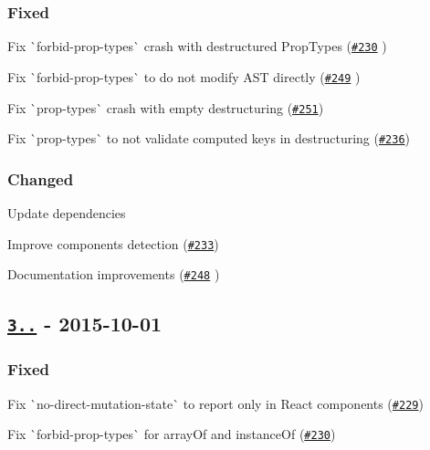 \subsubsection*{Fixed}


\begin{DoxyItemize}
\item Fix \`{}forbid-\/prop-\/types\`{} crash with destructured Prop\+Types (\href{https://github.com/yannickcr/eslint-plugin-react/issues/230}{\tt \#230} )
\item Fix \`{}forbid-\/prop-\/types\`{} to do not modify A\+ST directly (\href{https://github.com/yannickcr/eslint-plugin-react/issues/249}{\tt \#249} )
\item Fix \`{}prop-\/types\`{} crash with empty destructuring (\href{https://github.com/yannickcr/eslint-plugin-react/issues/251}{\tt \#251})
\item Fix \`{}prop-\/types\`{} to not validate computed keys in destructuring (\href{https://github.com/yannickcr/eslint-plugin-react/issues/236}{\tt \#236})
\end{DoxyItemize}

\subsubsection*{Changed}


\begin{DoxyItemize}
\item Update dependencies
\item Improve components detection (\href{https://github.com/yannickcr/eslint-plugin-react/issues/233}{\tt \#233})
\item Documentation improvements (\href{https://github.com/yannickcr/eslint-plugin-react/pull/248}{\tt \#248} )
\end{DoxyItemize}

\subsection*{\href{https://github.com/yannickcr/eslint-plugin-react/compare/v3.5.0...v3.5.1}{\tt 3..} -\/ 2015-\/10-\/01}

\subsubsection*{Fixed}


\begin{DoxyItemize}
\item Fix \`{}no-\/direct-\/mutation-\/state\`{} to report only in React components (\href{https://github.com/yannickcr/eslint-plugin-react/issues/229}{\tt \#229})
\item Fix \`{}forbid-\/prop-\/types\`{} for array\+Of and instance\+Of (\href{https://github.com/yannickcr/eslint-plugin-react/issues/230}{\tt \#230})
\end{DoxyItemize}

